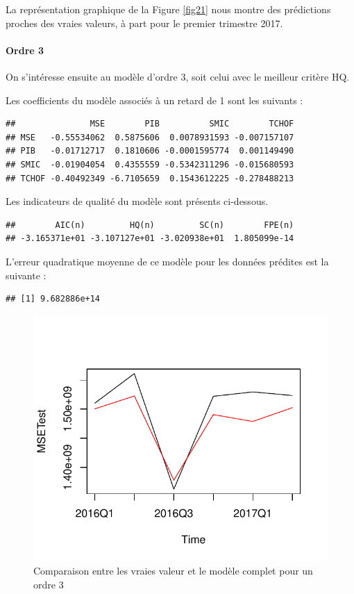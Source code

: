 \documentclass[11pt,]{article}
\let\oldparagraph\paragraph
\renewcommand{\paragraph}[1]{\oldparagraph{#1}\mbox{}}
\begin{document}
La représentation graphique de la Figure \ref{fig21} nous montre des
prédictions proches des vraies valeurs, à part pour le premier trimestre
2017.

\paragraph{Ordre 3}\label{ordre-3}

On s'intéresse ensuite au modèle d'ordre 3, soit celui avec le meilleur
critère HQ.

Les coefficients du modèle associés à un retard de 1 sont les suivants :

\begin{verbatim}
##               MSE        PIB          SMIC        TCHOF
## MSE   -0.55534062  0.5875606  0.0078931593 -0.007157107
## PIB   -0.01712717  0.1810606 -0.0001595774  0.001149490
## SMIC  -0.01904054  0.4355559 -0.5342311296 -0.015680593
## TCHOF -0.40492349 -6.7105659  0.1543612225 -0.278488213
\end{verbatim}

Les indicateurs de qualité du modèle sont présents ci-dessous.

\begin{verbatim}
##        AIC(n)         HQ(n)         SC(n)        FPE(n) 
## -3.165371e+01 -3.107127e+01 -3.020938e+01  1.805099e-14
\end{verbatim}

L'erreur quadratique moyenne de ce modèle pour les données prédites est
la suivante :

\begin{verbatim}
## [1] 9.682886e+14
\end{verbatim}

\begin{figure}[htbp]
\centering
\includegraphics{doc_files/figure-latex/unnamed-chunk-33-1.pdf}
\caption{\label{fig22} Comparaison entre les vraies valeur et le modèle
complet pour un ordre 3}
\end{figure}
\end{document}
